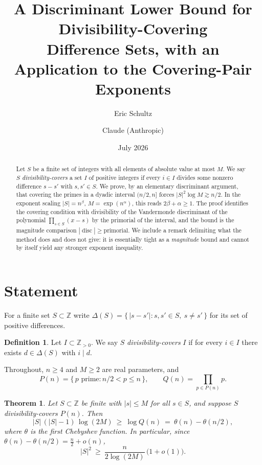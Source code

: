 \documentclass[11pt]{article}
\title{\bfseries A Discriminant Lower Bound for Divisibility-Covering\\
\large Difference Sets, with an Application to the Covering-Pair Exponents}
\author{Eric Schultz \and Claude (Anthropic)}
\date{July 2026}
\newtheorem{theorem}{Theorem}
\theoremstyle{definition}
\newtheorem{definition}{Definition}
\theoremstyle{remark}
\DeclareMathOperator{\disc}{disc}
\begin{document}
\maketitle

\begin{abstract}
Let $S$ be a finite set of integers with all elements of absolute value at most
$M$. We say $S$ \emph{divisibility-covers} a set $I$ of positive integers if
every $i\in I$ divides some nonzero difference $s-s'$ with $s,s'\in S$. We prove,
by an elementary discriminant argument, that covering the primes in a dyadic
interval $(n/2,n]$ forces
$|S|^2\log M \gtrsim n/2$. In the exponent scaling $|S|=n^{\beta}$,
$M=\exp(n^{\alpha})$, this reads $2\beta+\alpha\ge 1$. The proof identifies the
covering condition with divisibility of the Vandermonde discriminant of the
polynomial $\prod_{s\in S}(x-s)$ by the primorial of the interval, and the bound
is the magnitude comparison $|\!\disc| \ge \text{primorial}$. We include a remark
delimiting what the method does and does not give: it is essentially tight as a
\emph{magnitude} bound and cannot by itself yield any stronger exponent
inequality.
\end{abstract}

\section{Statement}

For a finite set $S\subset\mathbb Z$ write $\Delta(S)=\{\,|s-s'| : s,s'\in S,\ s\ne s'\,\}$
for its set of positive differences.

\begin{definition}
Let $I\subset\mathbb Z_{>0}$. We say $S$ \emph{divisibility-covers} $I$ if for
every $i\in I$ there exists $d\in\Delta(S)$ with $i\mid d$.
\end{definition}

Throughout, $n\ge 4$ and $M\ge 2$ are real parameters, and
\[
  P(n) = \{\,p \text{ prime} : n/2 < p \le n\,\},\qquad
  Q(n) = \prod_{p\in P(n)} p .
\]

\begin{theorem}\label{thm:main}
Let $S\subset\mathbb Z$ be finite with $|s|\le M$ for all $s\in S$, and suppose
$S$ divisibility-covers $P(n)$. Then
\[
  |S|\,(|S|-1)\,\log(2M)\ \ge\ \log Q(n)\ =\ \theta(n)-\theta(n/2),
\]
where $\theta$ is the first Chebyshev function. In particular, since
$\theta(n)-\theta(n/2)=\tfrac{n}{2}+o(n)$,
\[
  |S|^2\ \ge\ \frac{n}{2\log(2M)}\,\bigl(1+o(1)\bigr).
\]
\end{theorem}
\end{document}
